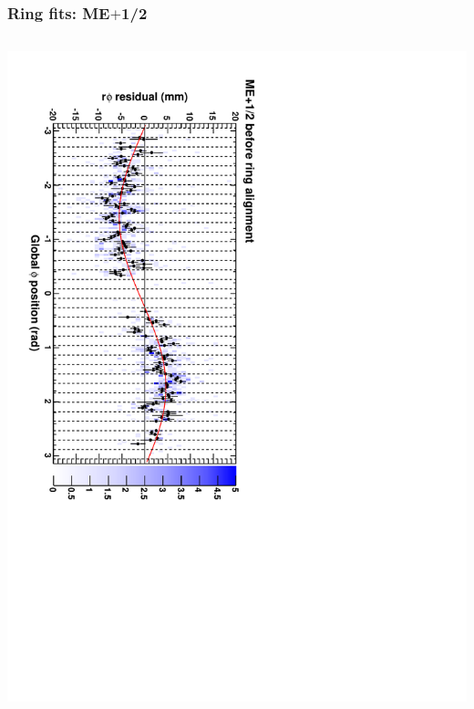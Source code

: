 \documentclass[compress]{beamer}
\begin{document}
\begin{frame}
\frametitle{Ring fits: ME$+$1/2}
\vfill
\begin{columns}
\includegraphics[height=\linewidth, angle=90]{ringfits_before/mep12.pdf}


\end{columns}
\end{frame}
\end{document}
